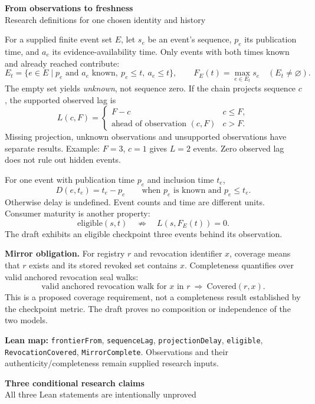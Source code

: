 \documentclass[12pt]{article}
\begin{document}
\begin{center}
{\Large\bfseries From observations to freshness}\\[4pt]
{Research definitions for one chosen identity and history}
\end{center}

For a supplied finite event set $E$, let $s_e$ be an event's sequence,
$p_e$ its publication time, and $a_e$ its evidence-availability time.
Only events with both times known and already reached contribute:
\[
 E_t=\{e\in E\mid p_e\text{ and }a_e\text{ known},\ p_e\le t,\ a_e\le t\},
 \qquad F_E(t)=\max_{e\in E_t}s_e\quad(E_t\ne\varnothing).
\]
The empty set yields \emph{unknown}, not sequence zero.
If the chain projects sequence $c$, the supported observed lag is
\[
 L(c,F)=
 \begin{cases}
 F-c & c\le F,\\
 \text{ahead of observation }(c,F) & c>F.
 \end{cases}
\]
Missing projection, unknown observations and unsupported observations have
separate results. Example: $F=3$, $c=1$ gives $L=2$ events.
Zero observed lag does not rule out hidden events.

For one event with publication time $p_e$ and inclusion time $t_e$,
\[
 D(e,t_e)=t_e-p_e\qquad\text{when }p_e\text{ is known and }p_e\le t_e.
\]
Otherwise delay is undefined. Event counts and time are different units.
Consumer maturity is another property:
\[
 \mathrm{eligible}(s,t)\quad\not\Rightarrow\quad L(s,F_E(t))=0.
\]
The draft exhibits an eligible checkpoint three events behind its observation.

\textbf{Mirror obligation.} For registry $r$ and revocation identifier $x$,
coverage means that $r$ exists and its stored revoked set contains $x$.
Completeness quantifies over valid anchored revocation seal walks:
\[
 \text{valid anchored revocation walk for }x\text{ in }r
 \ \Longrightarrow\ \mathrm{Covered}(r,x).
\]
This is a proposed coverage requirement, not a completeness result established
by the checkpoint metric. The draft proves no composition or independence of
the two models.

\textbf{Lean map:} \texttt{frontierFrom}, \texttt{sequenceLag},
\texttt{projectionDelay}, \texttt{eligible},\\
\texttt{RevocationCovered},
\texttt{MirrorComplete}. Observations and their authenticity/completeness
remain supplied research inputs.

\newpage
\begin{center}
{\Large\bfseries Three conditional research claims}\\[4pt]
{All three Lean statements are intentionally unproved}
\end{center}
\end{document}
